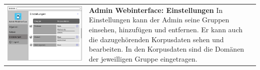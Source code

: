 \begin{tabular}{C{6cm}  L{7cm}}
    \includegraphics[width=\linewidth]{bilder/new vers. UI Design/Einstellungen/Einstellungen (1).png} & \textbf{Admin Webinterface: Einstellungen} \newline 
    In Einstellungen kann der Admin seine Gruppen einsehen, hinzufügen und entfernen. Er kann auch
    die dazugehörenden Korpusdaten sehen und bearbeiten. In den Korpusdaten sind die Domänen der jeweilligen Gruppe eingetragen. 
\end{tabular}

